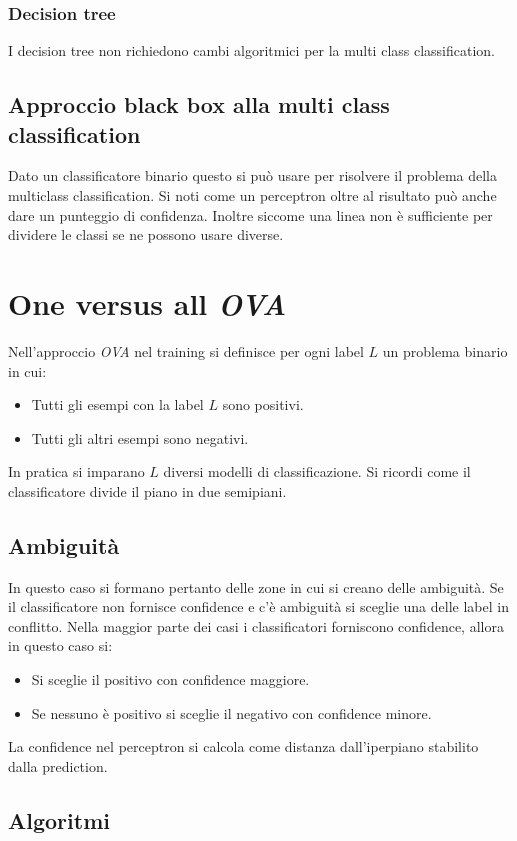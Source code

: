 		\subsubsection{Decision tree}
		I decision tree non richiedono cambi algoritmici per la multi class classification.

	\subsection{Approccio black box alla multi class classification}
	Dato un classificatore binario questo si pu\`o usare per risolvere il problema della multiclass classification.
	Si noti come un perceptron oltre al risultato pu\`o anche dare un punteggio di confidenza.
	Inoltre siccome una linea non \`e sufficiente per dividere le classi se ne possono usare diverse.

\section{One versus all \emph{OVA}}
Nell'approccio \emph{OVA} nel training si definisce per ogni label $L$ un problema binario in cui:
\begin{itemize}
	\item Tutti gli esempi con la label $L$ sono positivi.
	\item Tutti gli altri esempi sono negativi.
\end{itemize}
In pratica si imparano $L$ diversi modelli di classificazione.
Si ricordi come il classificatore divide il piano in due semipiani.

	\subsection{Ambiguit\`a}
	In questo caso si formano pertanto delle zone in cui si creano delle ambiguit\`a.
	Se il classificatore non fornisce confidence e c'\`e ambiguit\`a si sceglie una delle label in conflitto.
	Nella maggior parte dei casi i classificatori forniscono confidence, allora in questo caso si:
	\begin{itemize}
		\item Si sceglie il positivo con confidence maggiore.
		\item Se nessuno \`e positivo si sceglie il negativo con confidence minore.
	\end{itemize}
	La confidence nel perceptron si calcola come distanza dall'iperpiano stabilito dalla prediction.

	\subsection{Algoritmi}
	
	

